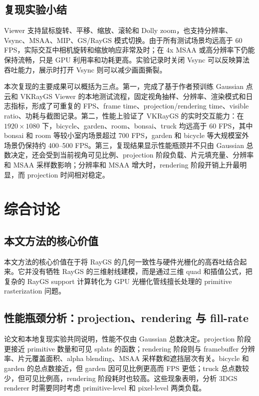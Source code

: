 \documentclass[12pt,hyperref,a4paper,UTF8]{ctexart}
\begin{document}
\subsection{复现实验小结}
Viewer 支持鼠标旋转、平移、缩放、滚轮和 Dolly zoom，也支持分辨率、Vsync、MSAA、MIP、GS/RayGS 模式切换。由于所有测试场景均远高于 60 FPS，实际交互中相机旋转和缩放响应非常及时；在 4x MSAA 或高分辨率下仍能保持流畅，只是 GPU 利用率和功耗更高。实验记录时关闭 Vsync 可以反映算法吞吐能力，展示时打开 Vsync 则可以减少画面撕裂。

本次复现的主要成果可以概括为三点。第一，完成了基于作者预训练 Gaussian 点云和 VKRayGS Viewer 的本地测试流程，固定视角抽样、分辨率、渲染模式和日志指标，形成了可重复的 FPS、frame time、projection/rendering time、visible ratio、功耗与截图记录。第二，性能上验证了 VKRayGS 的实时交互能力：在 $1920\times1080$ 下，bicycle、garden、room、bonsai、truck 均远高于 60 FPS，其中 bonsai 和 room 等较小室内场景超过 700 FPS，garden 和 bicycle 等大规模室外场景仍保持约 400--500 FPS。第三，复现结果显示性能瓶颈并不只由 Gaussian 总数决定，还会受到当前视角可见比例、projection 阶段负载、片元填充量、分辨率和 MSAA 采样数影响；分辨率和 MSAA 增大时，rendering 阶段开销上升最明显，而 projection 时间相对稳定。



\section{综合讨论}
\subsection{本文方法的核心价值}
本文方法的核心价值在于将 RayGS 的几何一致性与硬件光栅化的高吞吐结合起来。它并没有牺牲 RayGS 的三维射线建模，而是通过三维 quad 和插值公式，把复杂的 RayGS support 计算转化为 GPU 光栅化管线擅长处理的 primitive rasterization 问题。



\subsection{性能瓶颈分析：projection、rendering 与 fill-rate}
论文和本地复现实验共同说明，性能不仅由 Gaussian 总数决定。projection 阶段更接近 primitive 数量和可见 splats 的函数；rendering 阶段则与 framebuffer 分辨率、片元覆盖面积、alpha blending、MSAA 采样数和遮挡层次有关。bicycle 和 garden 的总点数接近，但 garden 因可见比例更高而 FPS 更低；truck 总点数较少，但可见比例高，rendering 阶段耗时也较高。这些现象表明，分析 3DGS renderer 时需要同时考虑 primitive-level 和 pixel-level 两类负载。
\end{document}
